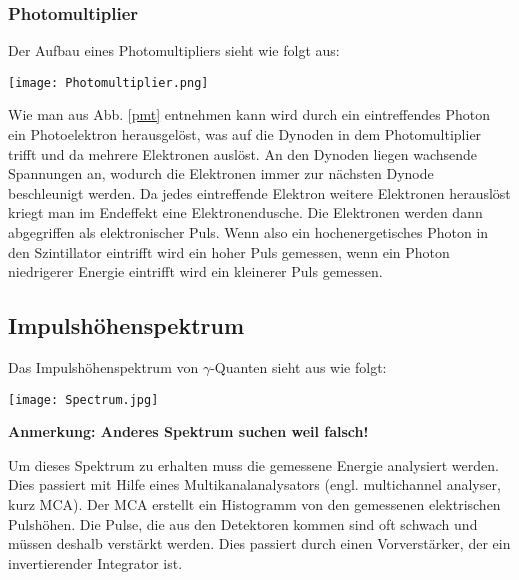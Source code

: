 \documentclass[12pt,a4paper,titlepage]{article}
\begin{document}
\subsubsection{Photomultiplier}

Der Aufbau eines Photomultipliers sieht wie folgt aus:\\

\begin{figure*}[h!]
	\centering
	\texttt{[image: Photomultiplier.png]}\\
	\caption{Aufbau eines Photomultipliers \cite{pmt}}
	\label{pmt}
\end{figure*}

Wie man aus Abb. \ref{pmt} entnehmen kann wird durch ein eintreffendes Photon ein Photoelektron herausgelöst, was auf die Dynoden in dem Photomultiplier trifft und da mehrere Elektronen auslöst. An den Dynoden liegen wachsende Spannungen an, wodurch die Elektronen immer zur nächsten Dynode beschleunigt werden. Da jedes eintreffende Elektron weitere Elektronen herauslöst kriegt man im Endeffekt eine Elektronendusche. Die Elektronen werden dann abgegriffen als elektronischer Puls. Wenn also ein hochenergetisches Photon in den Szintillator eintrifft wird ein hoher Puls gemessen, wenn ein Photon niedrigerer Energie eintrifft wird ein kleinerer Puls gemessen. 

\subsection{Impulshöhenspektrum}

Das Impulshöhenspektrum von $\gamma$-Quanten sieht aus wie folgt:

\begin{figure*}[h!]
	\centering
	\texttt{[image: Spectrum.jpg]}\\
	\caption{$\gamma$-Spektrum einer Am-Be-Quelle, gemessen mit einem Germanium-Detektor. Dieses Diagramm dient als ein Beispiel für den Compton-Effekt und die Paarbildung. \cite{spektrum}}
	\label{spektrum}
\end{figure*}

\textbf{Anmerkung: Anderes Spektrum suchen weil falsch!}

Um dieses Spektrum zu erhalten muss die gemessene Energie analysiert werden. Dies passiert mit Hilfe eines Multikanalanalysators (engl. multichannel analyser, kurz MCA). Der MCA erstellt ein Histogramm von den gemessenen elektrischen Pulshöhen. Die Pulse, die aus den Detektoren kommen sind oft schwach und müssen deshalb verstärkt werden. Dies passiert durch einen Vorverstärker, der ein invertierender Integrator ist.
\end{document}
